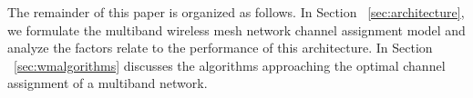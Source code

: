 The remainder of this paper is organized as follows. In Section ~\ref{sec:architecture}, we formulate the multiband wireless mesh network channel assignment model and analyze the factors relate to the performance of this architecture. 
In Section ~\ref{sec:wmalgorithms} discusses the algorithms approaching the optimal channel assignment of a multiband network. 

